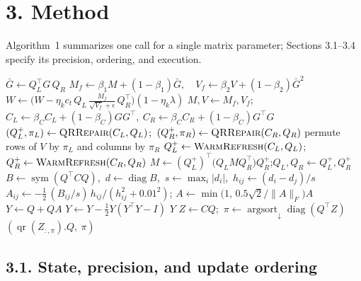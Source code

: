 \hypertarget{method}{%
\section{3. Method}\label{method}}

Algorithm~1 summarizes one call for a single matrix parameter;
Sections 3.1--3.4 specify its precision, ordering, and execution.

\begin{algorithm}[H]
\caption{One TurboSOAP call for \(W\in\mathbb{R}^{m\times n}\) at matrix
age \(t\ge1\) (warm10/QR50). Precision boundaries are omitted; see
Section 3.1.}
\begin{algorithmic}[1]
\State \(\bar G\gets Q_L^\top G\,Q_R\) 
\State \(M_f\gets\beta_1M+(1-\beta_1)\bar G,\quad
 V_f\gets\beta_2V+(1-\beta_2)\bar G^{2}\)
\State \(W\gets\bigl(W-\eta_k c_t\,Q_L\,\tfrac{M_f}{\sqrt{V_f}+\epsilon}\,Q_R^\top\bigr)(1-\eta_k\lambda)\)
\State \(M,V\gets M_f,V_f\);\quad
 \(C_L\gets\beta_CC_L+(1-\beta_C)GG^\top,\ C_R\gets\beta_CC_R+(1-\beta_C)G^\top G\)
 
 \State \((Q_L^+,\pi_L)\gets\textsc{QRRepair}(C_L,Q_L)\);\ \((Q_R^+,\pi_R)\gets\textsc{QRRepair}(C_R,Q_R)\)
 \State permute rows of \(V\) by \(\pi_L\) and columns by \(\pi_R\)
 
 \State \(Q_L^+\gets\textsc{WarmRefresh}(C_L,Q_L)\);\ \(Q_R^+\gets\textsc{WarmRefresh}(C_R,Q_R)\)
\Else
 \State \Return
\EndIf
\State \(M\gets (Q_L^+)^\top\bigl(Q_LMQ_R^\top\bigr)Q_R^+\);\quad \(Q_L,Q_R\gets Q_L^+,Q_R^+\)
\Statex
{}
 \State \(B\gets\operatorname{sym}(Q^\top CQ)\),\ \(d\gets\operatorname{diag}B\),\ \(s\gets\max_i|d_i|\),\ \(h_{ij}\gets(d_i-d_j)/s\)
 \State \(A_{ij}\gets-\tfrac12\,(B_{ij}/s)\,h_{ij}/(h_{ij}^2+0.01^2)\);\quad
 \(A\gets\min\bigl(1,\,0.5\sqrt2/\|A\|_F\bigr)A\)
 \State \(Y\gets Q+QA\)
  \(Y\gets Y-\tfrac12Y(Y^\top Y-I)\) \EndFor
 \State \Return \(Y\)
\EndFunction
{}
 \State \(Z\gets CQ\);\ \(\pi\gets\operatorname{argsort}_{\downarrow}\operatorname{diag}(Q^\top Z)\)
 \State \Return \((\operatorname{qr}(Z_{:,\pi}).Q,\ \pi)\)
\EndFunction
\end{algorithmic}
\end{algorithm}

\hypertarget{state-precision-and-update-ordering}{%
\subsection{3.1. State, precision, and update
ordering}\label{state-precision-and-update-ordering}}

